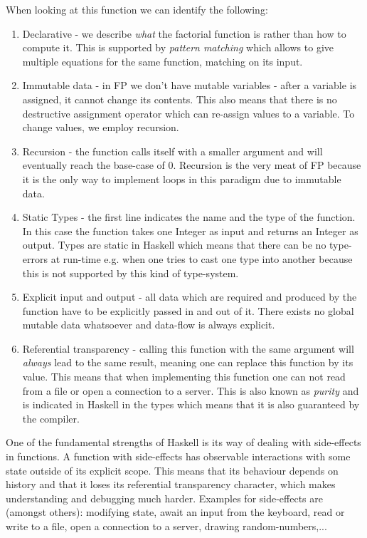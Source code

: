 When looking at this function we can identify the following: 
\begin{enumerate}
	\item Declarative - we describe \textit{what} the factorial function is rather than how to compute it. This is supported by \textit{pattern matching} which allows to give multiple equations for the same function, matching on its input. 
	
	\item Immutable data - in FP we don't have mutable variables - after a variable is assigned, it cannot change its contents. This also means that there is no destructive assignment operator which can re-assign values to a variable. To change values, we employ recursion.
	
	\item Recursion - the function calls itself with a smaller argument and will eventually reach the base-case of 0. Recursion is the very meat of FP because it is the only way to implement loops in this paradigm due to immutable data.
	
	\item Static Types - the first line indicates the name and the type of the function. In this case the function takes one Integer as input and returns an Integer as output. Types are static in Haskell which means that there can be no type-errors at run-time e.g. when one tries to cast one type into another because this is not supported by this kind of type-system.
	
	\item Explicit input and output - all data which are required and produced by the function have to be explicitly passed in and out of it. There exists no global mutable data whatsoever and data-flow is always explicit.
	
	\item Referential transparency - calling this function with the same argument will \textit{always} lead to the same result, meaning one can replace this function by its value. This means that when implementing this function one can not read from a file or open a connection to a server. This is also known as \textit{purity} and is indicated in Haskell in the types which means that it is also guaranteed by the compiler.
\end{enumerate}

One of the fundamental strengths of Haskell is its way of dealing with side-effects in functions. A function with side-effects has observable interactions with some state outside of its explicit scope. This means that its behaviour depends on history and that it loses its referential transparency character, which makes understanding and debugging much harder. Examples for side-effects are (amongst others): modifying state, await an input from the keyboard, read or write to a file, open a connection to a server, drawing random-numbers,...

